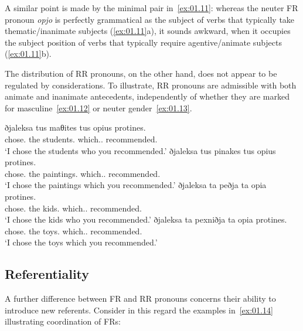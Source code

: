 \documentclass[output=paper]{langsci/langscibook}
\begin{document}
A similar point is made by the minimal pair in~\eqref{ex:01.11}: whereas
the neuter \gls{FR} pronoun \emph{opjo} is perfectly grammatical as the subject
of verbs that typically take thematic/inanimate subjects (\ref{ex:01.11}a),
it sounds awkward, when it occupies the subject position of verbs that
typically require agentive/animate subjects (\ref{ex:01.11}b).

\ea {}\label{ex:01.11}\judgewidth{\#\#}
	\z
\z

The distribution of \gls{RR} pronouns, on the other hand, does not appear to be
regulated by  considerations. To illustrate, \gls{RR} pronouns are
admissible with both animate and inanimate antecedents, independently of
whether they are marked for masculine~\eqref{ex:01.12} or neuter
gender~\eqref{ex:01.13}.

\ea {}\label{ex:01.12}
	\ea
		\gll ðjaleksa tus maθites {tus opius} protines.\\
			chose.\Fsg{} the students.\Acc{} which.\M{}.\Pl{} recommended.\Ssg{}\\
		\glt ‘I chose the students who you recommended.'
	\ex
		\gll ðjaleksa tus pinakes {tus opius} protines.\\
			chose.\Fsg{} the paintings.\Acc{} which.\M{}.\Pl{} recommended.\Ssg{}\\
		\glt \enquote*{I chose the paintings which you recommended.}
	\z
\ex {}\label{ex:01.13}
	\ea
		\gll ðjaleksa ta peðja {ta opia} protines.\\
			chose.\Fsg{} the kids.\Acc{} which.\glossN.\Pl{} recommended.\Ssg{}\\
		\glt ‘I chose the kids who you recommended.'
	\ex
		\gll ðjaleksa ta pexniðja {ta opia} protines.\\
			chose.\Fsg{} the toys.\Acc{} which.\glossN.\Pl{} recommended.\Ssg{}\\
		\glt ‘I chose the toys which you recommended.'
	\z
\z

\subsection{Referentiality}
A further difference between \gls{FR} and
\gls{RR} pronouns concerns their ability to introduce new referents.
Consider in this regard the examples in~\eqref{ex:01.14} illustrating
coordination of \glspl{FR}:
\end{document}
